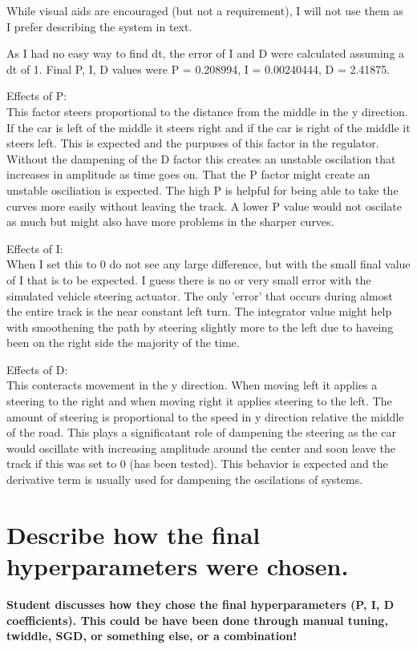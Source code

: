 \documentclass[12pt,a4paper]{article}
\begin{document}
While visual aids are encouraged (but not a requirement), I will not use them as I prefer describing the system in text. 

As I had no easy way to find dt, the error of I and D were calculated assuming a dt of 1. Final P, I, D values were P = 0.208994, I = 0.00240444, D = 2.41875. 

Effects of P: \\
This factor steers proportional to the distance from the middle in the y direction. If the car is left of the middle it steers right and if the car is right of the middle it steers left. This is expected and the purpuses of this factor in the regulator. Without the dampening of the D factor this creates an unstable oscilation that increases in amplitude as time goes on. That the P factor might create an unstable osciliation is expected. The high P is helpful for being able to take the curves more easily without leaving the track. A lower P value would not oscilate as much but might also have more problems in the sharper curves.

Effects of I: \\
When I set this to 0 do not see any large difference, but with the small final value of I that is to be expected. I guess there is no or very small error with the simulated vehicle steering actuator. The only 'error' that occurs during almost the entire track is the near constant left turn. The integrator value might help with smoothening the path by steering slightly more to the left due to haveing been on the right side the majority of the time.

Effects of D: \\
This conteracts movement in the y direction. When moving left it applies a steering to the right and when moving right it applies steering to the left. The amount of steering is proportional to the speed in y direction relative the middle of the road. This plays a significatant role of dampening the steering as the car would oscillate with increasing amplitude around the center and soon leave the track if this was set to 0 (has been tested). This behavior is expected and the derivative term is usually used for dampening the oscilations of systems.


\section{Describe how the final hyperparameters were chosen.}
\textbf{Student discusses how they chose the final hyperparameters (P, I, D coefficients). This could be have been done through manual tuning, twiddle, SGD, or something else, or a combination!}
\end{document}
